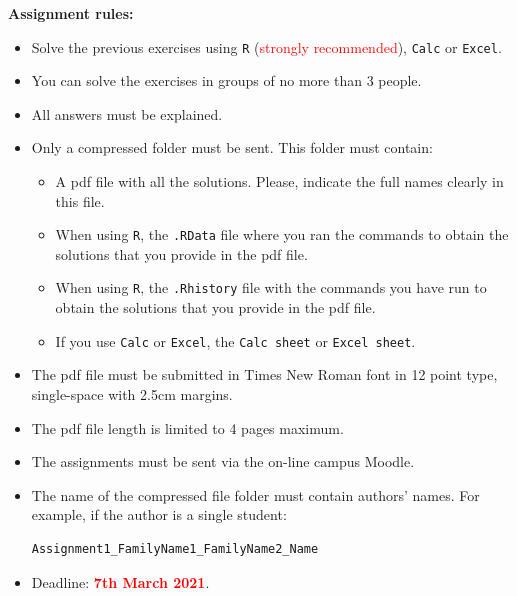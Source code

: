 \documentclass[12pt,a4]{report}
\begin{document}
\vspace{3cm}


{\large \textbf{Assignment rules:}}

\vspace{0.5cm}

\begin{itemize}
\item Solve the previous exercises using \texttt{R} (\textcolor{red}{strongly recommended}), \texttt{Calc} or \texttt{Excel}.

\item You can solve the exercises in groups of no more than 3 people.

\item All answers must be explained. 

\item Only a compressed folder must be sent. This folder must contain:
\begin{itemize}
\item A \textsf{pdf} file with all the solutions. Please, indicate the full names clearly in this file. 
\item When using \texttt{R}, the \texttt{.RData} file where you ran the commands to obtain the solutions that you provide in the \textsf{pdf} file.
\item When using \texttt{R}, the \texttt{.Rhistory} file with the commands you have run to obtain the solutions that you provide in the \textsf{pdf} file.
\item If you use \texttt{Calc} or \texttt{Excel}, the \texttt{Calc sheet} or \texttt{Excel sheet}.
\end{itemize}

\item The \textsf{pdf} file must be submitted in Times New Roman font in 12 point type, single-space with 2.5cm margins. 

\item The \textsf{pdf} file length is limited to 4 pages maximum.

\item The assignments must be sent via the on-line campus \textsf{Moodle}.

\item The name of the compressed file folder must contain authors' names. For example, if the author is a single student:
\begin{center}
\begin{verbatim}
Assignment1_FamilyName1_FamilyName2_Name
\end{verbatim}
\end{center}

\item Deadline: \textcolor{red}{\textbf{7th March 2021}}.
\end{itemize}
\end{document}
